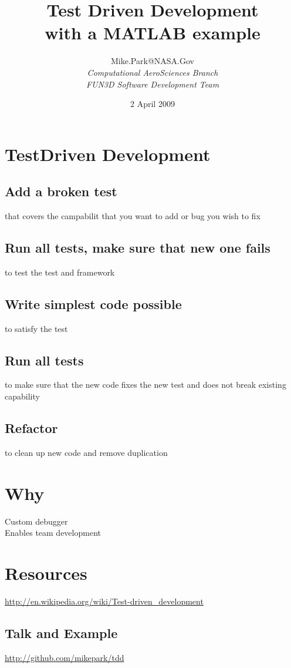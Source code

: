 \documentclass[twocolumn]{article}
\title{{\bfseries\Large Test Driven Development}\\ with a MATLAB example}
\author{
Mike.Park@NASA.Gov\\
	 {\itshape Computational AeroSciences Branch} \\
	 {\itshape FUN3D Software Development Team}
}
\date{2 April 2009}
\begin{document}
  
  \maketitle

  \section{TestDriven Development}
  \subsection{Add a broken test}
  that covers the campabilit that you want to add or bug you wish to fix
  \subsection{Run all tests, make sure that new one fails}
  to test the test and framework
  \subsection{Write simplest code possible}
  to satisfy the test
  \subsection{Run all tests}
  to make sure that the new code fixes the new test and does not break
  existing capability
  \subsection{Refactor}
  to clean up new code and remove duplication

  \section{Why}

  Custom debugger\\
  Enables team development

  \section{Resources}

  \url{http://en.wikipedia.org/wiki/Test-driven_development}

  \subsection{Talk and Example}  
  \url{http://github.com/mikepark/tdd}
\end{document}
